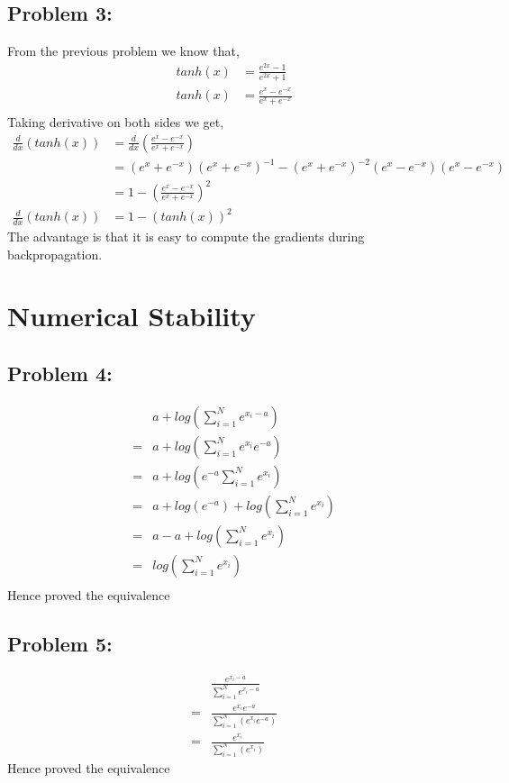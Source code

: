 \documentclass[5pt,a4paper]{article}
\begin{document}
	\subsection*{Problem 3:}
	From the previous problem we know that,
	\begin{eqnarray*}
		tanh(x)&=\frac{e^{2x}-1}{e^{2x}+1}\\
		tanh(x)&=\frac{e^{x}-e^{-x}}{e^{x}+e^{-x}}\\
	\end{eqnarray*}
	Taking derivative on both sides we get,
	\begin{eqnarray*}
		\frac{d}{dx}(tanh(x))&=\frac{d}{dx}(\frac{e^{x}-e^{-x}}{e^{x}+e^{-x}})\\
		&=(e^{x}+e^{-x})(e^{x}+e^{-x})^{-1}-(e^{x}+e^{-x})^{-2}(e^{x}-e^{-x})(e^{x}-e^{-x})\\
		&= 1- (\frac{e^{x}-e^{-x}}{e^{x}+e^{-x}})^2\\
		\frac{d}{dx}(tanh(x))&=1-(tanh(x))^2
	\end{eqnarray*}
	The advantage is that it is easy to compute the gradients during backpropagation.
	\section{ Numerical Stability}
	\subsection*{Problem 4:}
	\begin{eqnarray*}
	&a+log(\sum_{i=1}^{N}e^{x_i-a})\\
	=&a+log(\sum_{i=1}^{N}e^{x_i}e^{-a})\\
	=&a+log(e^{-a}\sum_{i=1}^{N}e^{x_i})\\
	=&a+log(e^{-a})+log(\sum_{i=1}^{N}e^{x_i})\\
	=&a-a+log(\sum_{i=1}^{N}e^{x_i})\\
	=&log(\sum_{i=1}^{N}e^{x_i})\\
	\end{eqnarray*}
	Hence proved the equivalence
	
	\subsection*{Problem 5:}
	\begin{eqnarray*}
		&\frac{e^{x_i-a}}{\sum_{i=1}^{N}e^{x_i-a}}\\
		=&\frac{e^{x_i}e^{-a}}{\sum_{i=1}^{N}(e^{x_i}e^{-a})}\\
		=&\frac{e^{x_i}}{\sum_{i=1}^{N}(e^{x_i})}
	\end{eqnarray*}
	Hence proved the equivalence
	
\end{document}
